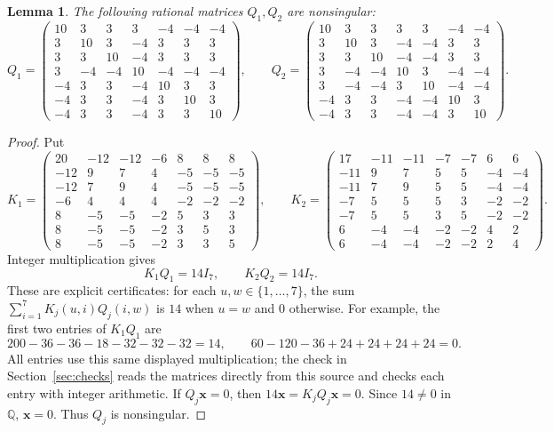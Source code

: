 \documentclass[11pt]{article}
\newcommand\rats{{\mathbb Q}}
\newcommand\Zx{{\mathbf x}}
\newtheorem{lemma}[theorem]{Lemma}
\theoremstyle{definition}
\begin{document}
\begin{lemma}\label{lem:inverse}
The following rational matrices $Q_1,Q_2$ are nonsingular:
\[
 Q_1=
 \begin{pmatrix}
 10&3&3&3&-4&-4&-4\\
 3&10&3&-4&3&3&3\\
 3&3&10&-4&3&3&3\\
 3&-4&-4&10&-4&-4&-4\\
 -4&3&3&-4&10&3&3\\
 -4&3&3&-4&3&10&3\\
 -4&3&3&-4&3&3&10
 \end{pmatrix},
 \qquad
 Q_2=
 \begin{pmatrix}
 10&3&3&3&3&-4&-4\\
 3&10&3&-4&-4&3&3\\
 3&3&10&-4&-4&3&3\\
 3&-4&-4&10&3&-4&-4\\
 3&-4&-4&3&10&-4&-4\\
 -4&3&3&-4&-4&10&3\\
 -4&3&3&-4&-4&3&10
 \end{pmatrix}.
\]
\end{lemma}
\begin{proof}
Put
\begingroup
\setlength{\arraycolsep}{4pt}
\[
 K_1=
 \begin{pmatrix}
 20&-12&-12&-6&8&8&8\\
 -12&9&7&4&-5&-5&-5\\
 -12&7&9&4&-5&-5&-5\\
 -6&4&4&4&-2&-2&-2\\
 8&-5&-5&-2&5&3&3\\
 8&-5&-5&-2&3&5&3\\
 8&-5&-5&-2&3&3&5
 \end{pmatrix},
 \qquad
 K_2=
 \begin{pmatrix}
 17&-11&-11&-7&-7&6&6\\
 -11&9&7&5&5&-4&-4\\
 -11&7&9&5&5&-4&-4\\
 -7&5&5&5&3&-2&-2\\
 -7&5&5&3&5&-2&-2\\
 6&-4&-4&-2&-2&4&2\\
 6&-4&-4&-2&-2&2&4
 \end{pmatrix}.
\]
\endgroup
Integer multiplication gives
\begin{equation}\label{eq:inverse-cert}
 K_1Q_1=14I_7,\qquad K_2Q_2=14I_7.
\end{equation}
These are explicit certificates: for each $u,w\in\{1,\ldots,7\}$,
the sum $\sum_{i=1}^7K_j(u,i)Q_j(i,w)$ is $14$ when $u=w$ and $0$
otherwise. For example, the first two entries of $K_1Q_1$ are
\[
 200-36-36-18-32-32-32=14,\qquad
 60-120-36+24+24+24+24=0.
\]
All entries use this same displayed multiplication; the check in
Section~\ref{sec:checks} reads the matrices directly from this source
and checks each entry with integer arithmetic. If $Q_j\Zx=0$, then
$14\Zx=K_jQ_j\Zx=0$. Since $14\ne0$ in $\rats$, $\Zx=0$.
Thus $Q_j$ is nonsingular.
\end{proof}
\end{document}

